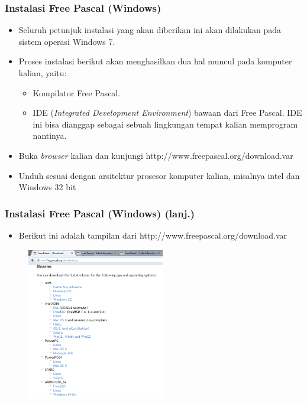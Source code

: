 \documentclass{beamer}
\begin{document}
\begin{frame}
\frametitle{Instalasi Free Pascal (Windows)}
\begin{itemize}
	\item Seluruh petunjuk instalasi yang akan diberikan ini akan dilakukan pada sistem operasi Windows 7.
	\item Proses instalasi berikut akan menghasilkan dua hal muncul pada komputer kalian, yaitu:
	\begin{itemize}
		\item Kompilator Free Pascal.
		\item IDE (\textit{Integrated Development Environment}) bawaan dari Free Pascal. IDE ini bisa dianggap sebagai sebuah lingkungan tempat kalian memprogram nantinya.
	\end{itemize}
	\item Buka \textit{browser} kalian dan kunjungi http://www.freepascal.org/download.var
	\item Unduh sesuai dengan arsitektur prosesor komputer kalian, misalnya intel dan Windows 32 bit
\end{itemize}
\end{frame}

\begin{frame}
\frametitle{Instalasi Free Pascal (Windows) (lanj.)}
\begin{itemize}
	\item Berikut ini adalah tampilan dari http://www.freepascal.org/download.var
\end{itemize}
\begin{figure}
	\includegraphics[width=6cm]{asset/dl_list1.PNG}
\end{figure}
\end{frame}
\end{document}
